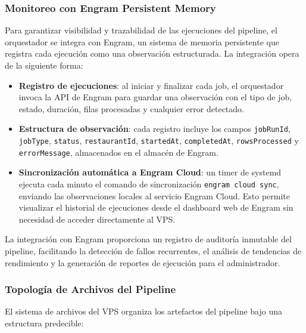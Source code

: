 \subsubsection{Monitoreo con Engram Persistent Memory}

Para garantizar visibilidad y trazabilidad de las ejecuciones del
pipeline, el orquestador se integra con Engram, un sistema de memoria
persistente que registra cada ejecución como una observación
estructurada. La integración opera de la siguiente forma:

\begin{itemize}[leftmargin=1.5em]
  \item \textbf{Registro de ejecuciones}: al iniciar y finalizar cada
  job, el orquestador invoca la API de Engram para guardar una
  observación con el tipo de job, estado, duración, filas procesadas y
  cualquier error detectado.
  \item \textbf{Estructura de observación}: cada registro incluye los
  campos \texttt{jobRunId}, \texttt{jobType}, \texttt{status},
  \texttt{restaurantId}, \texttt{startedAt}, \texttt{completedAt},
  \texttt{rowsProcessed} y \texttt{errorMessage}, almacenados en el
  almacén de Engram.
  \item \textbf{Sincronización automática a Engram Cloud}: un timer de
  systemd ejecuta cada minuto el comando de sincronización
  \texttt{engram cloud sync}, enviando las observaciones locales al
  servicio Engram Cloud. Esto permite visualizar el historial de
  ejecuciones desde el dashboard web de Engram sin necesidad de acceder
  directamente al VPS.
\end{itemize}

La integración con Engram proporciona un registro de auditoría inmutable
del pipeline, facilitando la detección de fallos recurrentes, el análisis
de tendencias de rendimiento y la generación de reportes de ejecución para
el administrador.

\subsubsection{Topología de Archivos del Pipeline}

El sistema de archivos del VPS organiza los artefactos del pipeline bajo
una estructura predecible:

